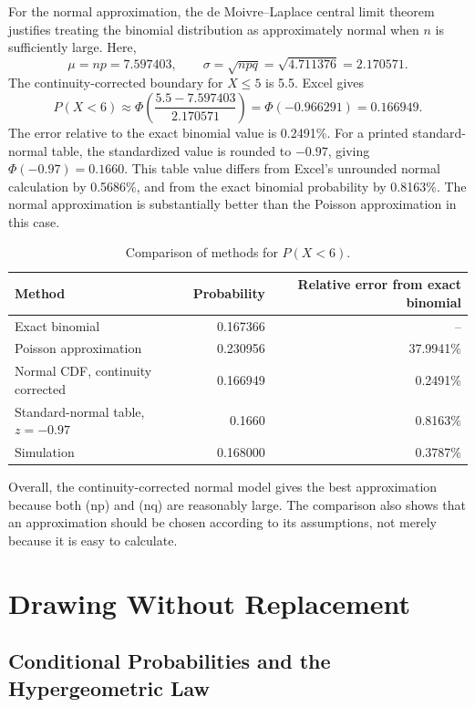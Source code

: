 \documentclass[12pt]{article}
\theoremstyle{definition}
\numberwithin{equation}{section}
\begin{document}
For the normal approximation, the de Moivre--Laplace central limit theorem justifies treating the binomial distribution as approximately normal when \(n\) is sufficiently large. Here,
\[
\mu=np=7.597403,
\qquad
\sigma=\sqrt{npq}=\sqrt{4.711376}=2.170571.
\]
The continuity-corrected boundary for \(X\leq5\) is 5.5. Excel gives
\[
P(X<6)\approx \Phi\!\left(\frac{5.5-7.597403}{2.170571}\right)
=\Phi(-0.966291)=0.166949.
\]
The error relative to the exact binomial value is 0.2491\%. For a printed standard-normal table, the standardized value is rounded to \(-0.97\), giving \(\Phi(-0.97)=0.1660\). This table value differs from Excel's unrounded normal calculation by 0.5686\%, and from the exact binomial probability by 0.8163\%. The normal approximation is substantially better than the Poisson approximation in this case.

\begin{table}[H]
\centering
\caption{Comparison of methods for \(P(X<6)\).}
\begin{tabular}{lrr}
\toprule
Method & Probability & Relative error from exact binomial\\
\midrule
Exact binomial & 0.167366 & --\\
Poisson approximation & 0.230956 & 37.9941\%\\
Normal CDF, continuity corrected & 0.166949 & 0.2491\%\\
Standard-normal table, \(z=-0.97\) & 0.1660 & 0.8163\%\\
Simulation & 0.168000 & 0.3787\%\\
\bottomrule
\end{tabular}
\end{table}

Overall, the continuity-corrected normal model gives the best approximation because both (np) and (nq) are reasonably large. The comparison also shows that an approximation should be chosen according to its assumptions, not merely because it is easy to calculate.

\vfill\pagebreak

\section{Drawing Without Replacement}

\subsection{Conditional Probabilities and the Hypergeometric Law}
\end{document}

